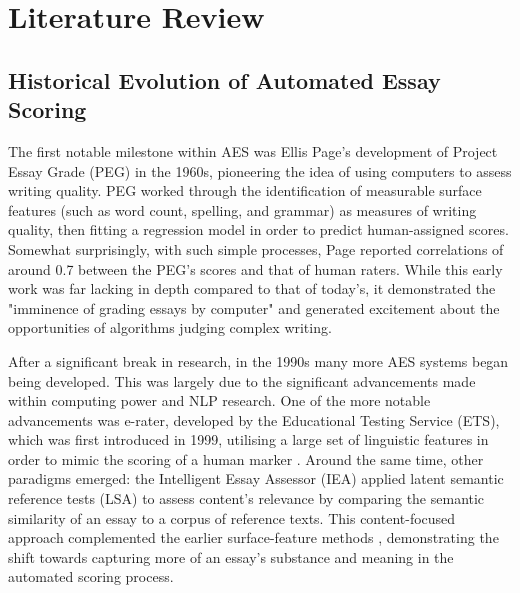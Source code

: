 \documentclass[10pt]{report}
\begin{document}
\chapter{Literature Review}
\section{Historical Evolution of Automated Essay Scoring}
The first notable milestone within AES was Ellis Page’s development of Project Essay Grade (PEG) in the 1960s, pioneering the idea of using computers to assess writing quality. PEG worked through the identification of measurable surface features (such as word count, spelling, and grammar) as measures of writing quality, then fitting a regression model in order to predict human-assigned scores. Somewhat surprisingly, with such simple processes, Page reported correlations of around 0.7 between the PEG's scores and that of human raters. While this early work was far lacking in depth compared to that of today’s, it demonstrated the "imminence of grading essays by computer" \parencite{page1966imminence} and generated excitement about the opportunities of algorithms judging complex writing.

After a significant break in research, in the 1990s many more AES systems began being developed. This was largely due to the significant advancements made within computing power and NLP research. One of the more notable advancements was e-rater, developed by the Educational Testing Service (ETS), which was first introduced in 1999, utilising a large set of linguistic features in order to mimic the scoring of a human marker \parencite{e-rater2006}. Around the same time, other paradigms emerged: the Intelligent Essay Assessor (IEA) applied latent semantic reference tests (LSA) to assess content's relevance by comparing the semantic similarity of an essay to a corpus of reference texts. This content-focused approach complemented the earlier surface-feature methods \parencite{landauer2003iea}, demonstrating the shift towards capturing more of an essay's substance and meaning in the automated scoring process.
\end{document}
